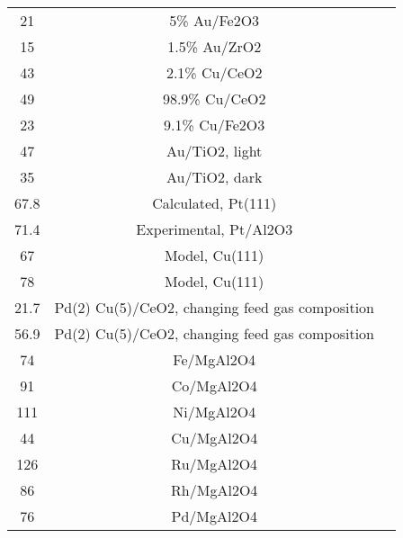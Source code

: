 \begin{center}
\begin{longtable}{ccc}
21                   & 5\% Au/Fe2O3                            & \cite{Thinon_2008}         \\
15                   & 1.5\% Au/ZrO2                           & \cite{Thinon_2008}         \\
43                   & 2.1\% Cu/CeO2                           & \cite{Thinon_2008}         \\
49                   & 98.9\% Cu/CeO2                          & \cite{Thinon_2008}         \\
23                   & 9.1\% Cu/Fe2O3                          & \cite{Thinon_2008}         \\
47                   & Au/TiO2, light                          & \cite{Upadhye_2015}         \\
35                   & Au/TiO2, dark                           & \cite{Upadhye_2015}         \\
67.8                 & Calculated, Pt(111)                     & \cite{Grabow_2008}         \\
71.4                 & Experimental, Pt/Al2O3                  & \cite{Grabow_2008}         \\
67                   & Model, Cu(111)                          & \cite{Gokhale_2008}         \\
78                   & Model, Cu(111)                          & \cite{Gokhale_2008}         \\
21.7                 & Pd(2) Cu(5)/CeO2, changing feed gas composition & \cite{Kugai_2011}         \\
56.9                 & Pd(2) Cu(5)/CeO2, changing feed gas composition & \cite{Kugai_2011}         \\
74                   & Fe/MgAl2O4              & \cite{Boisen_2010}         \\
91                   & Co/MgAl2O4              & \cite{Boisen_2010}         \\
111                  & Ni/MgAl2O4              & \cite{Boisen_2010}         \\
44                   & Cu/MgAl2O4              & \cite{Boisen_2010}         \\
126                  & Ru/MgAl2O4              & \cite{Boisen_2010}         \\
86                   & Rh/MgAl2O4              & \cite{Boisen_2010}         \\
76                   & Pd/MgAl2O4              & \cite{Boisen_2010}         \\

\end{longtable}
\end{center}
